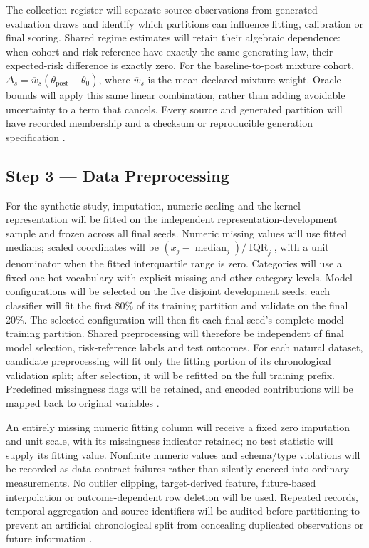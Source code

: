 The collection register will separate source observations from generated evaluation draws and identify which partitions can influence fitting, calibration or final scoring. Shared regime estimates will retain their algebraic dependence: when cohort and risk reference have exactly the same generating law, their expected-risk difference is exactly zero. For the baseline-to-post mixture cohort, $\Delta_s=\overline w_s(\theta_{\mathrm{post}}-\theta_0)$, where $\overline w_s$ is the mean declared mixture weight. Oracle bounds will apply this same linear combination, rather than adding avoidable uncertainty to a term that cancels. Every source and generated partition will have recorded membership and a checksum or reproducible generation specification \cite{hoeffding,souza}.

\subsection*{Step 3 --- Data Preprocessing}
For the synthetic study, imputation, numeric scaling and the kernel representation will be fitted on the independent representation-development sample and frozen across all final seeds. Numeric missing values will use fitted medians; scaled coordinates will be $(x_j-\operatorname{median}_j)/\operatorname{IQR}_j$, with a unit denominator when the fitted interquartile range is zero. Categories will use a fixed one-hot vocabulary with explicit missing and other-category levels. Model configurations will be selected on the five disjoint development seeds: each classifier will fit the first 80\% of its training partition and validate on the final 20\%. The selected configuration will then fit each final seed's complete model-training partition. Shared preprocessing will therefore be independent of final model selection, risk-reference labels and test outcomes. For each natural dataset, candidate preprocessing will fit only the fitting portion of its chronological validation split; after selection, it will be refitted on the full training prefix. Predefined missingness flags will be retained, and encoded contributions will be mapped back to original variables \cite{souza}.

An entirely missing numeric fitting column will receive a fixed zero imputation and unit scale, with its missingness indicator retained; no test statistic will supply its fitting value. Nonfinite numeric values and schema/type violations will be recorded as data-contract failures rather than silently coerced into ordinary measurements. No outlier clipping, target-derived feature, future-based interpolation or outcome-dependent row deletion will be used. Repeated records, temporal aggregation and source identifiers will be audited before partitioning to prevent an artificial chronological split from concealing duplicated observations or future information \cite{souza,nist}.

